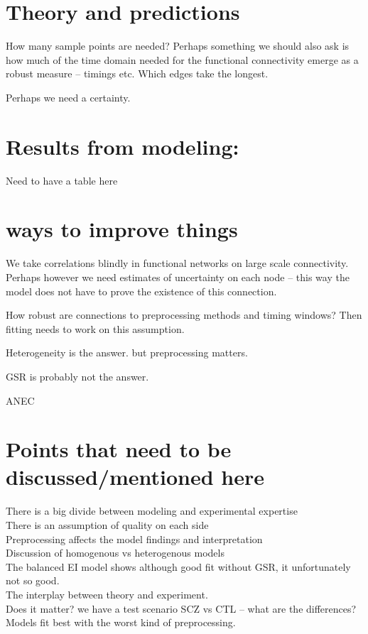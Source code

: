 \documentclass[oneside]{zHenriquesLab-StyleBioRxiv}
\begin{document}
\section*{Theory and predictions}

How many sample points are needed?
Perhaps something we should also ask is how much of the time domain needed for the functional connectivity emerge as a robust measure -- timings etc. Which edges take the longest.

Perhaps we need a certainty. 

\section*{Results from modeling:}
Need to have a table here

\section*{ways to improve things}
We take correlations blindly in functional networks on large scale connectivity. Perhaps however we need estimates of uncertainty on each node -- this way the model does not have to prove the existence of this connection. 

How robust are connections to preprocessing methods and timing windows? Then fitting needs to work on this assumption.

Heterogeneity is the answer. but preprocessing matters. 

GSR is probably not the answer.

ANEC

\section*{Points that need to be discussed/mentioned here}

There is a big divide between modeling and experimental expertise \\
There is an assumption of quality on each side \\
Preprocessing affects the model findings and interpretation \\
Discussion of homogenous vs heterogenous models\\
The balanced EI model shows although good fit without GSR, it unfortunately not so good. \\
The interplay between theory and experiment. \\
Does it matter? we have a test scenario SCZ vs CTL -- what are the differences? \\
Models fit best with the worst kind of preprocessing.
\end{document}
